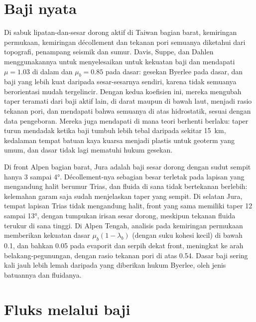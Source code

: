 \section{Baji nyata}\label{sec:b3:orogenic-wedges:real}

Di sabuk lipatan-dan-sesar dorong aktif di Taiwan bagian barat, kemiringan permukaan,
kemiringan décollement dan tekanan pori semuanya diketahui dari topografi,
penampang seismik dan sumur. Davis, Suppe, dan Dahlen menggunakannya untuk menyelesaikan
 untuk kekuatan baji dan mendapati $\mu = 1.03$
di dalam dan $\mu_b = 0.85$ pada dasar: gesekan Byerlee pada dasar, dan
baji yang lebih kuat daripada sesar-sesarnya sendiri, karena tidak semuanya berorientasi
mudah tergelincir. Dengan kedua koefisien ini, mereka mengubah taper teramati dari
baji aktif lain, di darat maupun di bawah laut, menjadi rasio tekanan pori, dan
mendapati bahwa semuanya di atas hidrostatik, sesuai dengan data pengeboran. Mereka juga mendapati
di mana teori berhenti berlaku: taper turun mendadak ketika baji tumbuh lebih tebal
daripada sekitar \qty{15}{km}, kedalaman tempat batuan kaya kuarsa menjadi plastis
untuk geoterm yang umum, dan dasar tidak lagi mematuhi hukum gesekan.

Di front Alpen bagian barat, Jura adalah baji sesar dorong dengan sudut sempit
hanya 3 sampai \ang{4}. Décollement-nya sebagian besar terletak pada lapisan yang mengandung halit
berumur Trias, dan fluida di sana tidak bertekanan berlebih: kelemahan
garam saja sudah menjelaskan taper yang sempit. Di selatan Jura, tempat
lapisan Trias tidak mengandung halit, front yang sama memiliki taper 12 sampai
\ang{13}, dengan tumpukan irisan sesar dorong, meskipun tekanan fluida terukur
di sana tinggi. Di Alpen Tengah, analisis  pada kemiringan permukaan
memberikan kekuatan dasar $\mu_b(1 - \lambda_b)$ (dengan suku
kohesi kecil) di bawah 0.1, dan bahkan 0.05 pada evaporit dan serpih dekat front,
meningkat ke arah belakang-pegunungan, dengan rasio tekanan pori di atas 0.54. Dasar
baji sering kali jauh lebih lemah daripada yang diberikan hukum Byerlee, oleh
jenis batuannya dan fluidanya.

\section{Fluks melalui baji}\label{sec:b3:orogenic-wedges:flux}

